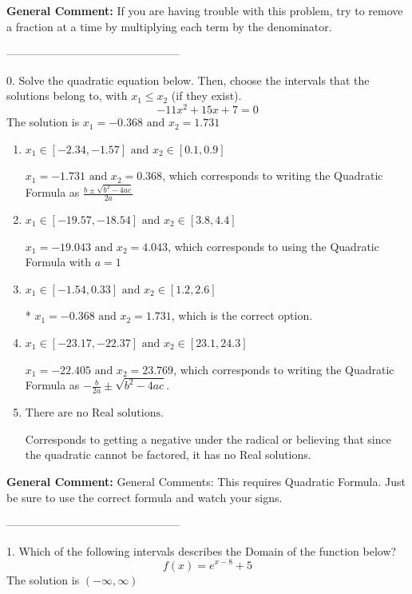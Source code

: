 \documentclass{extbook}[14pt]
\begin{document}
\textbf{General Comment:} If you are having trouble with this problem, try to remove a fraction at a time by multiplying each term by the denominator. 

-----------------------------------------------

0. Solve the quadratic equation below. Then, choose the intervals that the solutions belong to, with $x_1 \leq x_2$ (if they exist).
\[ -11x^{2} +15 x + 7 = 0 \] 
The solution is $ x_1 = -0.368 \text{ and } x_2 = 1.731 $ 

\begin{enumerate}[label=\Alph*.] 
\item $ x_1 \in [-2.34, -1.57] \text{ and } x_2 \in [0.1, 0.9] $ 

  $x_1 = -1.731 \text{ and } x_2 = 0.368$, which corresponds to writing the Quadratic Formula as $\frac{b \pm \sqrt{b^2 - 4ac}}{2a}$ 
\item $ x_1 \in [-19.57, -18.54] \text{ and } x_2 \in [3.8, 4.4] $ 

  $x_1 = -19.043 \text{ and } x_2 = 4.043$, which corresponds to using the Quadratic Formula with $a=1$ 
\item $ x_1 \in [-1.54, 0.33] \text{ and } x_2 \in [1.2, 2.6] $ 

 * $x_1 = -0.368 \text{ and } x_2 = 1.731$, which is the correct option. 
\item $ x_1 \in [-23.17, -22.37] \text{ and } x_2 \in [23.1, 24.3] $ 

  $x_1 = -22.405 \text{ and } x_2 = 23.769$, which corresponds to writing the Quadratic Formula as $-\frac{b}{2a} \pm \sqrt{b^2 - 4ac}$. 
\item $ \text{There are no Real solutions.} $ 

 Corresponds to getting a negative under the radical or believing that since the quadratic cannot be factored, it has no Real solutions. 
\end{enumerate} 
 
\textbf{General Comment:} General Comments: This requires Quadratic Formula. Just be sure to use the correct formula and watch your signs. 

-----------------------------------------------

1. Which of the following intervals describes the Domain of the function below?
\[ f(x) = e^{x-8}+5 \] 
The solution is $ (-\infty, \infty) $ 
\end{document}
